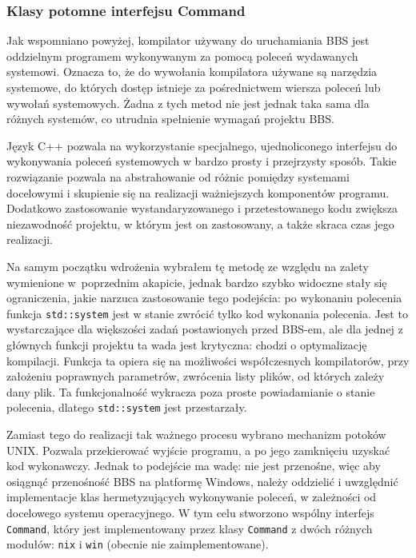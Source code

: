 \subsubsection{Klasy potomne interfejsu Command}

Jak wspomniano powyżej, kompilator używany do uruchamiania BBS jest oddzielnym programem wykonywanym za pomocą poleceń wydawanych systemowi. Oznacza to, że do wywołania kompilatora używane są narzędzia systemowe, do których dostęp istnieje za pośrednictwem wiersza poleceń lub wywołań systemowych. Żadna z tych metod nie jest jednak taka sama dla różnych systemów, co utrudnia spełnienie wymagań projektu BBS.

Język C++ pozwala na wykorzystanie specjalnego, ujednoliconego interfejsu do wykonywania poleceń systemowych w bardzo prosty i przejrzysty sposób. Takie rozwiązanie pozwala na abstrahowanie od różnic pomiędzy systemami docelowymi i skupienie się na realizacji ważniejszych komponentów programu. Dodatkowo zastosowanie wystandaryzowanego i przetestowanego kodu zwiększa niezawodność projektu, w którym jest on zastosowany, a także skraca czas jego realizacji.

Na samym początku wdrożenia wybrałem tę metodę ze względu na zalety wymienione w~poprzednim akapicie, jednak bardzo szybko widoczne stały się ograniczenia, jakie narzuca zastosowanie tego podejścia: po wykonaniu polecenia funkcja \texttt{std::system} jest w stanie zwrócić tylko kod wykonania polecenia. Jest to wystarczające dla większości zadań postawionych przed BBS-em, ale dla jednej z głównych funkcji projektu ta wada jest krytyczna: chodzi o optymalizację kompilacji. Funkcja ta opiera się na możliwości współczesnych kompilatorów, przy założeniu poprawnych parametrów, zwrócenia listy plików, od których zależy dany plik. Ta funkcjonalność wykracza poza proste powiadamianie o stanie polecenia, dlatego \texttt{std::system} jest przestarzały.

Zamiast tego do realizacji tak ważnego procesu wybrano mechanizm potoków UNIX. Pozwala przekierować wyjście programu, a po jego zamknięciu uzyskać kod wykonawczy. Jednak to podejście ma wadę: nie jest przenośne, więc aby osiągnąć przenośność BBS na platformę Windows, należy oddzielić i uwzględnić implementacje klas hermetyzujących wykonywanie poleceń, w zależności od docelowego systemu operacyjnego. W tym celu stworzono wspólny interfejs \texttt{Command}, który jest implementowany przez klasy \texttt{Command} z dwóch różnych modułów: \texttt{nix} i \texttt{win} (obecnie nie zaimplementowane).

